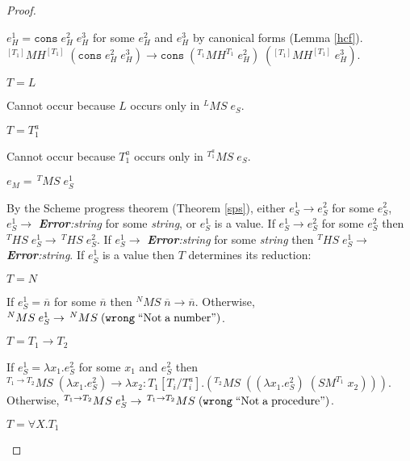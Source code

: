 \begin{mps}
\begin{proof}
\begin{mps-case-13}
\begin{mps-case-13-4}
$e_{H}^{1}=\mathtt{cons}\;e_{H}^{2}\;e_{H}^{3}$ for some $e_{H}^{2}$ and $e_{H}^{3}$ by canonical forms (Lemma \ref{hcf}).  $^{[T_{1}]}MH^{[T_{1}]}\;(\mathtt{cons}\;e_{H}^{2}\;e_{H}^{3})\rightarrow\mathtt{cons}\;(^{T_{1}}MH^{T_{1}}\;e_{H}^{2})\;(^{[T_{1}]}MH^{[T_{1}]}\;e_{H}^{3})$.
\end{mps-case-13-4}
\begin{mps-case-13-5}
$T=L$

Cannot occur because $L$ occurs only in $^{L}MS\;e_{S}$.
\end{mps-case-13-5}
\begin{mps-case-13-6}
$T=T_{1}^{a}$

Cannot occur because $T_{1}^{a}$ occurs only in $^{T_{1}^{a}}MS\;e_{S}$.
\end{mps-case-13-6}
\end{mps-case-13}
\begin{mps-case-14}
$e_{M}=\,^{T}MS\;e_{S}^{1}$

By the Scheme progress theorem (Theorem \ref{sps}), either $e_{S}^{1}\rightarrow e_{S}^{2}$ for some $e_{S}^{2}$, $e_{S}^{1}\rightarrow$ \emph{\textbf{Error}:\;string} for some \emph{string}, or $e_{S}^{1}$ is a value.  If $e_{S}^{1}\rightarrow e_{S}^{2}$ for some $e_{S}^{2}$ then $^{T}HS\;e_{S}^{1}\rightarrow\,^{T}HS\;e_{S}^{2}$.  If $e_{S}^{1}\rightarrow$ \emph{\textbf{Error}:\;string} for some \emph{string} then $^{T}HS\;e_{S}^{1}\rightarrow$ \emph{\textbf{Error}:\;string}.  If $e_{S}^{1}$ is a value then $T$ determines its reduction:
\begin{mps-case-14-1}
$T=N$

If $e_{S}^{1}=\overline{n}$ for some $\overline{n}$ then $^{N}MS\;\overline{n}\rightarrow\overline{n}$.  Otherwise, $^{N}MS\;e_{S}^{1}\rightarrow\,^{N}MS\;(\mathtt{wrong}\;\mathrm{``Not\;a\;number"})$.
\end{mps-case-14-1}
\begin{mps-case-14-2}
$T=T_{1}\rightarrow T_{2}$

If $e_{S}^{1}=\lambda x_{1}.e_{S}^{2}$ for some $x_{1}$ and $e_{S}^{2}$ then $^{T_{1}\rightarrow T_{2}}MS\;(\lambda x_{1}.e_{S}^{2})\rightarrow\lambda x_{2}:T_{1}[T_{i}/T^{a}_{i}].(^{T_{2}}MS\;((\lambda x_{1}.e_{S}^{2})\;(SM^{T_{1}}\;x_{2})))$.  Otherwise, $^{T_{1}\rightarrow T_{2}}MS\;e_{S}^{1}\rightarrow\,^{T_{1}\rightarrow T_{2}}MS\;(\mathtt{wrong}\;\mathrm{``Not\;a\;procedure"})$.
\end{mps-case-14-2}
\begin{mps-case-14-3}
$T=\forall X.T_{1}$


\end{mps-case-14-3}
\end{mps-case-14}
\end{proof}
\end{mps}
